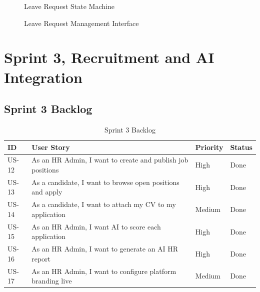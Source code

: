 \documentclass[12pt,a4paper]{report}
\newcommand{\cmark}{\ding{51}}
\begin{document}
\begin{figure}[H]
\centering
{}
\caption{Leave Request State Machine}
\label{fig:leave_state}
\end{figure}

\begin{figure}[H]
\centering
{}
\caption{Leave Request Management Interface}
\label{fig:leave_ui}
\end{figure}

\section{Sprint 3, Recruitment and AI Integration}

\subsection{Sprint 3 Backlog}

\begin{table}[H]
\centering
\caption{Sprint 3 Backlog}
\label{tab:s3_backlog}
\begin{tabular}{|C{1.2cm}|L{7cm}|C{2cm}|C{2.5cm}|}
\hline
{}
\textbf{ID} & \textbf{User Story} & \textbf{Priority} & \textbf{Status} \\
\hline
US-12 & As an HR Admin, I want to create and publish job positions & High & \cmark Done \\
\hline
US-13 & As a candidate, I want to browse open positions and apply & High & \cmark Done \\
\hline
US-14 & As a candidate, I want to attach my CV to my application & Medium & \cmark Done \\
\hline
US-15 & As an HR Admin, I want AI to score each application & High & \cmark Done \\
\hline
US-16 & As an HR Admin, I want to generate an AI HR report & High & \cmark Done \\
\hline
US-17 & As an HR Admin, I want to configure platform branding live & Medium & \cmark Done \\
\hline
\end{tabular}
\end{table}
\end{document}
